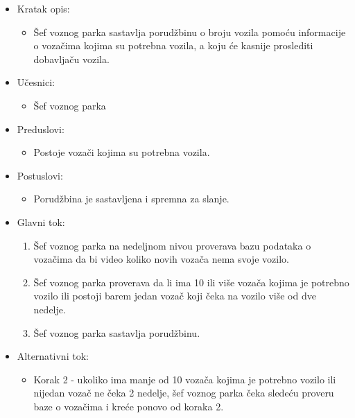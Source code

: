 \begin{itemize}
	\item Kratak opis:
		\begin{itemize}
			\item Šef voznog parka sastavlja porudžbinu o broju vozila pomoću informacije o vozačima kojima su potrebna vozila, a koju će kasnije proslediti dobavljaču vozila.		
		\end{itemize}

	\item Učesnici:
		\begin{itemize}
		    \item Šef voznog parka
		\end{itemize}


	\item Preduslovi:
		\begin{itemize}
		    \item Postoje vozači kojima su potrebna vozila.
		\end{itemize}


	\item Postuslovi:
		\begin{itemize}
			\item Porudžbina je sastavljena i spremna za slanje.
	\end{itemize}

	\item Glavni tok:
		\begin{enumerate}
		    \item Šef voznog parka na nedeljnom nivou proverava bazu podataka o vozačima da bi video koliko novih vozača nema svoje vozilo.
		    \item Šef voznog parka proverava da li ima 10 ili više vozača kojima je potrebno vozilo ili postoji barem jedan vozač koji čeka na vozilo više od dve nedelje.
		    \item Šef voznog parka sastavlja porudžbinu.
		\end{enumerate}

	\item Alternativni tok:
		\begin{itemize}
		    \item Korak 2 - ukoliko ima manje od 10 vozača kojima je potrebno vozilo ili nijedan vozač ne čeka 2 nedelje, šef voznog parka čeka sledeću proveru baze o vozačima i kreće ponovo od koraka 2.
		\end{itemize}

\end{itemize}

